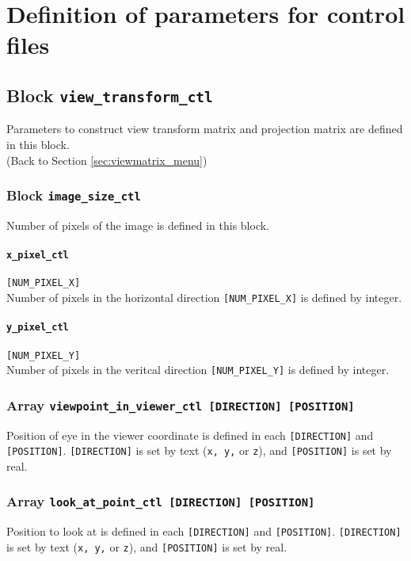 \section{Definition of parameters for control files}
\label{section:def_control}

\subsection{Block {\tt view\_transform\_ctl}}
\label{href_t:view_transform_ctl}
Parameters to construct view transform matrix and projection matrix are defined in this block. \\
(Back to Section \ref{sec:viewmatrix_menu}) \\

\subsubsection{Block {\tt image\_size\_ctl}}
\label{href_t:image_size_ctl}
Number of pixels of the image is defined in this block.

\paragraph{\tt x\_pixel\_ctl}
\label{href_t:x_pixel_ctl}
\verb|[NUM_PIXEL_X]| \\
Number of pixels in the horizontal direction \verb|[NUM_PIXEL_X]| is defined by integer.

\paragraph{\tt y\_pixel\_ctl}
\label{href_t:y_pixel_ctl}
\verb|[NUM_PIXEL_Y]| \\
Number of pixels in the veritcal direction \verb|[NUM_PIXEL_Y]| is defined by integer.

\subsubsection{Array {\tt viewpoint\_in\_viewer\_ctl [DIRECTION] [POSITION]}}
\label{href_t:viewpoint_in_viewer_ctl}
Position of eye in the viewer coordinate is defined in each \verb|[DIRECTION]| and \verb|[POSITION]|. \verb|[DIRECTION]| is set by text (\verb|x, y,| or \verb|z|), and \verb|[POSITION]| is set by real.

\subsubsection{Array {\tt look\_at\_point\_ctl [DIRECTION] [POSITION]}}
\label{href_t:look_at_point_ctl}
Position to look at is defined in each \verb|[DIRECTION]| and \verb|[POSITION]|. \verb|[DIRECTION]| is set by text (\verb|x, y,| or \verb|z|), and \verb|[POSITION]| is set by real.

